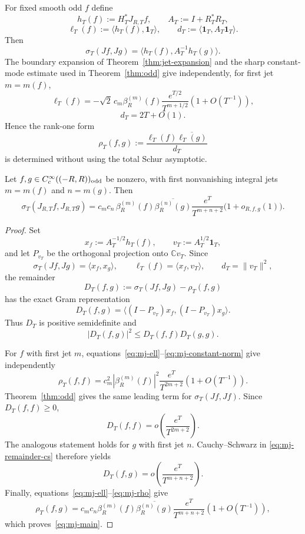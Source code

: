 For fixed smooth odd $f$ define
\[
 h_T(f):=H_T^*J_{R,T}f,
 \qquad
 A_T:=I+R_T^*R_T,
\]
\[
 \ell_T(f):=\langle h_T(f),\mathbf1_T\rangle,
 \qquad
 d_T:=\langle\mathbf1_T,A_T\mathbf1_T\rangle.
\tag{MJ.1}\label{eq:mj-basic}
\]
Then
\[
 \sigma_T(Jf,Jg)=\langle h_T(f),A_T^{-1}h_T(g)\rangle.
\tag{MJ.2}\label{eq:mj-sigma}
\]
The boundary expansion of Theorem~\ref{thm:jet-expansion} and the sharp constant-mode
estimate used in Theorem~\ref{thm:odd} give independently, for first jet $m=m(f)$,
\[
 \ell_T(f)
 =-\sqrt2\,c_m\beta_R^{(m)}(f)
 \frac{e^{T/2}}{T^{m+1/2}}(1+O(T^{-1})),
\tag{MJ.3}\label{eq:mj-ell}
\]
\[
 \boxed{d_T=2T+O(1).}
\tag{MJ.4}\label{eq:mj-constant-norm}
\]
Hence the rank-one form
\[
 \rho_T(f,g):=\frac{\ell_T(f)\overline{\ell_T(g)}}{d_T}
\tag{MJ.5}\label{eq:mj-rho}
\]
is determined without using the total Schur asymptotic.

\begin{theorem}\label{thm:mixed-jet}
Let $f,g\in C_c^\infty((-R,R))_{\rm odd}$ be nonzero, with first nonvanishing integral
jets $m=m(f)$ and $n=m(g)$.  Then
\[
 \boxed{
 \sigma_T(J_{R,T}f,J_{R,T}g)
 =c_mc_n\,
 \beta_R^{(m)}(f)\overline{\beta_R^{(n)}(g)}
 \frac{e^T}{T^{m+n+2}}
 \bigl(1+o_{R,f,g}(1)\bigr).
 }
\tag{MJ.6}\label{eq:mj-main}
\]
\end{theorem}

\begin{proof}
Set
\[
 x_f:=A_T^{-1/2}h_T(f),
 \qquad
 v_T:=A_T^{1/2}\mathbf1_T,
\]
and let $P_{v_T}$ be the orthogonal projection onto $\mathbb Cv_T$.  Since
\[
 \sigma_T(Jf,Jg)=\langle x_f,x_g\rangle,
 \qquad
 \ell_T(f)=\langle x_f,v_T\rangle,
 \qquad
 d_T=\|v_T\|^2,
\]
the remainder
\[
 D_T(f,g):=\sigma_T(Jf,Jg)-\rho_T(f,g)
\]
has the exact Gram representation
\[
 \boxed{
 D_T(f,g)
 =\langle(I-P_{v_T})x_f,(I-P_{v_T})x_g\rangle.
 }
\tag{MJ.7}\label{eq:mj-remainder-gram}
\]
Thus $D_T$ is positive semidefinite and
\[
 |D_T(f,g)|^2\le D_T(f,f)D_T(g,g).
\tag{MJ.8}\label{eq:mj-remainder-cs}
\]

For $f$ with first jet $m$, equations~\eqref{eq:mj-ell}--\eqref{eq:mj-constant-norm} give independently
\[
 \rho_T(f,f)
 =c_m^2|\beta_R^{(m)}(f)|^2
 \frac{e^T}{T^{2m+2}}(1+O(T^{-1})).
\tag{MJ.9}\label{eq:mj-rho-diag}
\]
Theorem~\ref{thm:odd} gives the same leading term for
$\sigma_T(Jf,Jf)$.  Since $D_T(f,f)\ge0$,
\[
 D_T(f,f)
 =o\!\left(\frac{e^T}{T^{2m+2}}\right).
\tag{MJ.10}\label{eq:mj-Ddiag}
\]
The analogous statement holds for $g$ with first jet $n$.  Cauchy--Schwarz in
\eqref{eq:mj-remainder-cs} therefore yields
\[
 D_T(f,g)
 =o\!\left(\frac{e^T}{T^{m+n+2}}\right).
\tag{MJ.11}\label{eq:mj-Dmixed}
\]
Finally, equations~\eqref{eq:mj-ell}--\eqref{eq:mj-rho} give
\[
 \rho_T(f,g)
 =c_mc_n\beta_R^{(m)}(f)\overline{\beta_R^{(n)}(g)}
 \frac{e^T}{T^{m+n+2}}(1+O(T^{-1})),
\]
which proves~\eqref{eq:mj-main}.
\end{proof}

